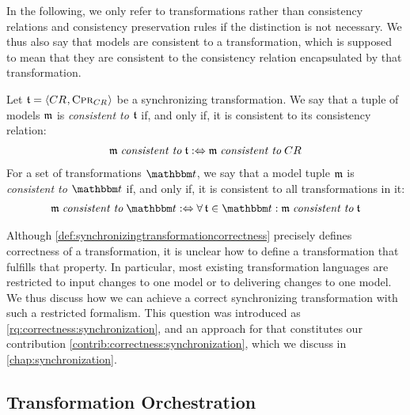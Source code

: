 In the following, we only refer to transformations rather than consistency relations and consistency preservation rules if the distinction is not necessary.
We thus also say that models are consistent to a transformation, which is supposed to mean that they are consistent to the consistency relation encapsulated by that transformation.

\begin{definition}
    \label{def:consistencytransformation}
    Let $\transformation{t} = \tupled{\consistencyrelation{CR}{}, \consistencypreservationrule{\consistencyrelation{CR}{}}}$ be a synchronizing transformation.
    We say that a tuple of models $\modeltuple{m}$ is \emph{consistent to} $\transformation{t}$ if, and only if, it is consistent to its consistency relation:
    \begin{align*}
        \modeltuple{m} \consistenttomath \transformation{t} \equivalentperdefinition \modeltuple{m} \consistenttomath \consistencyrelation{CR}{}
    \end{align*}
    For a set of transformations $\transformationset{T}$, we say that a model tuple $\modeltuple{m}$ is \emph{consistent to} $\transformationset{T}$ if, and only if, it is consistent to all transformations in it:
    \begin{align*}
        \modeltuple{m} \consistenttomath \transformationset{T} \equivalentperdefinition \forall \transformation{t} \in \transformationset{T} : \modeltuple{m} \consistenttomath \transformation{t}
    \end{align*}
\end{definition}

Although \autoref{def:synchronizingtransformationcorrectness} precisely defines correctness of a transformation, it is unclear how to define a transformation that fulfills that property.
In particular, most existing transformation languages are restricted to input changes to one model or to delivering changes to one model.
We thus discuss how we can achieve a correct synchronizing transformation with such a restricted formalism.
This question was introduced as \autoref{rq:correctness:synchronization}, and an approach for that constitutes our contribution \autoref{contrib:correctness:synchronization}, which we discuss in \autoref{chap:synchronization}.


\subsection{Transformation Orchestration}

